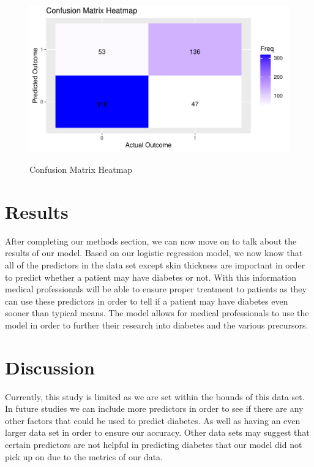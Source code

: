 \documentclass[12pt]{article}
\begin{document}
  \begin{figure}[tbp]
      \centering
      \caption{Confusion Matrix Heatmap}
      \includegraphics[width=\textwidth]{Confusion Matrix Heatmap}
      \label{fig:Heatmap}
      \end{figure}



\section{Results}
\label{sec:resu}



After completing our methods section, we can now move on to talk about the results of our model. Based on our logistic regression model, 
we now know that all of the predictors in the data set except skin thickness are important in order to predict whether a patient may have 
diabetes or not. With this information medical professionals will be able to ensure proper treatment to patients as they can use these 
predictors in order to tell if a patient may have diabetes even sooner than typical means. The model allows for medical professionals to 
use the model in order to further their research into diabetes and the various precursors.

\section{Discussion}
\label{sec:disc}

Currently, this study is limited as we are set within the bounds of this data set. In future studies we can include more predictors in 
order to see if there are any other factors that could be used to predict diabetes. As well as having an even larger data set in order to 
ensure our accuracy. Other data sets may suggest that certain predictors are not helpful in predicting diabetes that our model did not pick 
up on due to the metrics of our data. 
\end{document}
